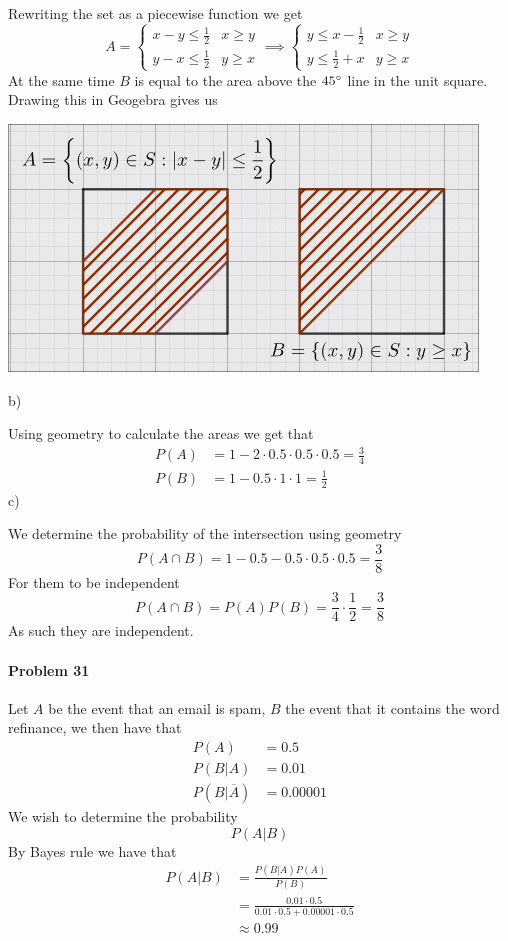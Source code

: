 Rewriting the set as a piecewise function we get
\[
    A=\begin{cases}
        x-y\leq \frac{1}{2} & x\geq y \\
        y-x\leq\frac{1}{2} & y\geq x
    \end{cases}
    \implies
    \begin{cases}
        y\leq x-\frac{1}{2} & x\geq y \\
        y\leq \frac{1}{2}+x & y\geq x
    \end{cases}
\]
At the same time $B$ is equal to the area above the $45\degree$ line in the unit square. Drawing this in Geogebra gives us

\includegraphics[width=\textwidth]{p30}

b) 

Using geometry to calculate the areas we get that
\begin{align*}
    P(A)&=1-2\cdot0.5\cdot 0.5\cdot 0.5=\frac{3}{4} \\
    P(B)&=1-0.5\cdot 1\cdot 1=\frac{1}{2}
\end{align*}
c)

We determine the probability of the intersection using geometry
\[
    P(A\cap B)=1-0.5-0.5\cdot 0.5\cdot 0.5=\frac{3}{8}
\]
For them to be independent
\[
    P(A\cap B)=P(A)P(B)=\frac{3}{4}\cdot\frac{1}{2}=\frac{3}{8}
\]
As such they are independent.
\paragraph{Problem 31}
Let $A$ be the event that an email is spam, $B$ the event that it contains the word refinance, we then have that
\begin{align*}
    P(A)&=0.5 \\
    P(B|A)&=0.01 \\
    P(B|\overline{A})&=0.00001
\end{align*}
We wish to determine the probability
\[
    P(A|B)
\]
By Bayes rule we have that
\begin{align*}
    P(A|B)&=\frac{P(B|A)P(A)}{P(B)} \\
          &=\frac{0.01\cdot 0.5}{0.01\cdot 0.5+0.00001\cdot 0.5} \\
          &\approx0.99
\end{align*}
